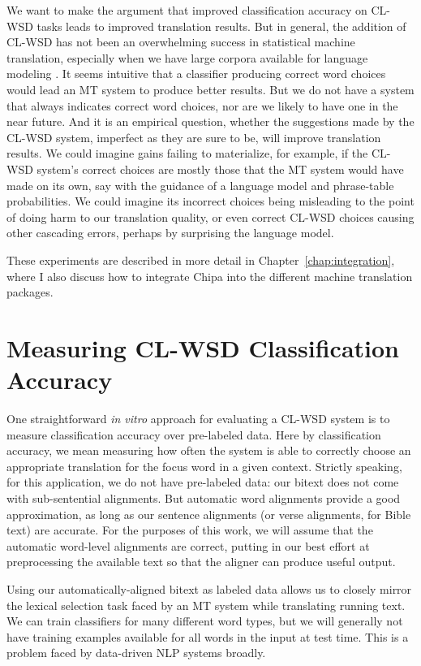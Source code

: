 We want to make the argument that improved classification accuracy on CL-WSD
tasks leads to improved translation results.
But in general, the addition of CL-WSD has not been an overwhelming success in
statistical machine translation, especially when we have large corpora
available for language modeling \cite{carpuatpsd}.
It seems intuitive that a
classifier producing correct word choices would lead an MT system to produce
better results. But we do not have a system that always indicates correct word
choices, nor are we likely to have one in the near future. And it is an
empirical question, whether the suggestions made by the CL-WSD system,
imperfect as they are sure to be, will improve translation results. We could
imagine gains failing to materialize, for example, if the CL-WSD system's
correct choices are mostly those that the MT system would have made on its own,
say with the guidance of a language model and phrase-table probabilities.
We could imagine its incorrect choices being misleading to the point of doing
harm to our translation quality, or even correct CL-WSD choices causing other
cascading errors, perhaps by surprising the language model.

These experiments are described in more detail in
Chapter~\ref{chap:integration}, where I also discuss how to integrate Chipa
into the different machine translation packages.

\section{Measuring CL-WSD Classification Accuracy}
One straightforward \emph{in vitro} approach for evaluating a CL-WSD system is
to measure classification accuracy over pre-labeled data. Here by
classification accuracy, we mean measuring how often the system is able to
correctly choose an appropriate translation for the focus word in a given
context.
Strictly speaking, for this application, we
do not have pre-labeled data: our bitext does not come with sub-sentential
alignments. But automatic word alignments provide a good approximation, as long
as our sentence alignments (or verse alignments, for Bible text) are accurate.
For the purposes of this work, we will assume that the automatic word-level
alignments are correct, putting in our best effort at preprocessing the
available text so that the aligner can produce useful output.

Using our automatically-aligned bitext as labeled data allows us to closely
mirror the lexical selection task faced by an MT system while translating
running text. We can train classifiers for many different word types, but we
will generally not have training examples available for all words in the input
at test time. This is a problem faced by data-driven NLP systems broadly.

